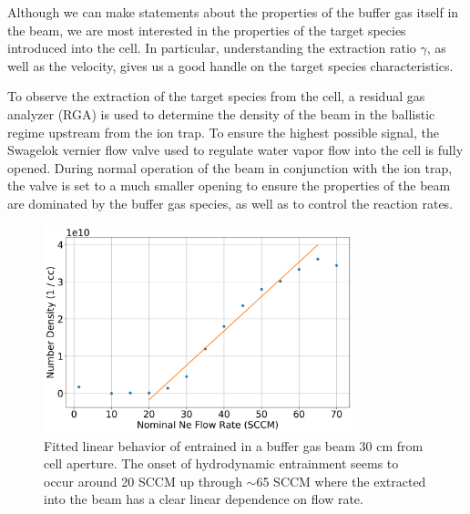 Although we can make statements about the properties of the buffer gas itself in the beam, we are most interested in the properties of the target species introduced into the cell. In particular, understanding the extraction ratio $\gamma$, as well as the velocity, gives us a good handle on the target species characteristics.

To observe the extraction of the target species from the cell, a residual gas analyzer (RGA) is used to determine the density of the beam in the ballistic regime upstream from the ion trap. To ensure the highest possible signal, the Swagelok vernier flow valve used to regulate water vapor flow into the cell is fully opened. During normal operation of the beam in conjunction with the ion trap, the valve is set to a much smaller opening to ensure the properties of the beam are dominated by the buffer gas species, as well as to control the reaction rates.

\begin{figure}[H]
	\centering
	\includegraphics[width=0.8\textwidth]{images/CBGB_hydrodynamic_fit.png}
	\caption{Fitted linear behavior of  entrained in a  buffer gas beam 30 cm from cell aperture. The onset of hydrodynamic entrainment seems to occur around 20 SCCM up through $\sim$65 SCCM where the  extracted into the beam has a clear linear dependence on flow rate.}
	\label{fig: rga entrainment}
\end{figure}

